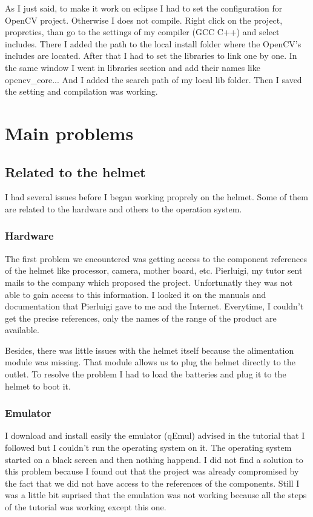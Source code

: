 	\par As I just said, to make it work on eclipse I had to set the configuration for OpenCV project. Otherwise I does not compile. Right click on the project, propreties, than	go to the settings of my compiler (GCC  C++) and select includes. There I added the path to the local install folder where the OpenCV's includes are located. After that I had to set the libraries to link one by one. In the same window I went in libraries section and add their names like opencv\_core... And I added the search path of my local lib folder. Then I saved the setting and compilation was working.
	
	
	\section{Main problems}	
	\subsection{Related to the helmet}
	\par I had several issues before I began working proprely on the helmet. Some of them are related to the hardware and others to the operation system.
	\subsubsection{Hardware}
	\par The first problem we encountered was getting access to the component references of the helmet like processor, camera, mother board, etc. Pierluigi, my tutor sent mails to the company which proposed the project. Unfortunatly they was not able to gain access to this information. I looked it on the manuals and documentation that Pierluigi gave to me and the Internet. Everytime, I couldn't get the precise references, only the names of the range of the product are available.

	\par Besides, there was little issues with the helmet itself because the alimentation module was missing. That module allows us to plug the helmet directly to the outlet. To resolve the problem I had to load the batteries and plug it to the helmet to boot it.

	\subsubsection{Emulator}
	
	\par I download and install easily the emulator (qEmul) advised in the tutorial that I followed but I couldn't run the operating system on  it. The operating system started on a black screen and then nothing happend. I did not find a solution to this problem because I found out that the project was already compromised by the fact that we did not have access to the references of the components. Still I was a little bit suprised that the emulation was not working because all the steps of the tutorial was working except this one.
	
